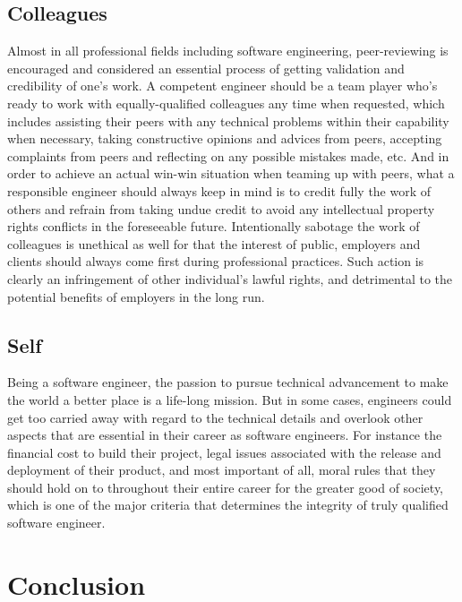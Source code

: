  
 
 \subsection{Colleagues}
 
 Almost in all professional fields including software engineering, peer-reviewing is encouraged and considered an essential process of getting validation and credibility of one's work. A competent engineer should be a team player who's ready to work with equally-qualified colleagues any time when requested, which includes assisting their peers with any technical problems within their capability when necessary, taking constructive opinions and advices from peers, accepting complaints from peers and reflecting on any possible mistakes made, etc. And in order to achieve an actual win-win situation when teaming up with peers, what a responsible engineer should always keep in mind is to credit fully the work of others and refrain from taking undue credit\cite{Gotterbarn:1999:PST:308769.308770} to avoid any intellectual property rights conflicts in the foreseeable future. Intentionally sabotage the work of colleagues is unethical as well for that the interest of public, employers and clients should always come first during professional practices. Such action is clearly an infringement of other individual's lawful rights, and detrimental to the potential benefits of employers in the long run.
 
 
 \subsection{Self}
 
 Being a software engineer, the passion to pursue technical advancement to make the world a better place is a life-long mission. But in some cases, engineers could get too carried away with regard to the technical details and overlook other aspects that are essential in their career as software engineers. For instance the financial cost to build their project, legal issues associated with the release and deployment of their product, and most important of all, moral rules that they should hold on to throughout their entire career for the greater good of society, which is one of the major criteria that determines the integrity of truly qualified software engineer.
 

 
 
 
 \section{Conclusion}
 
